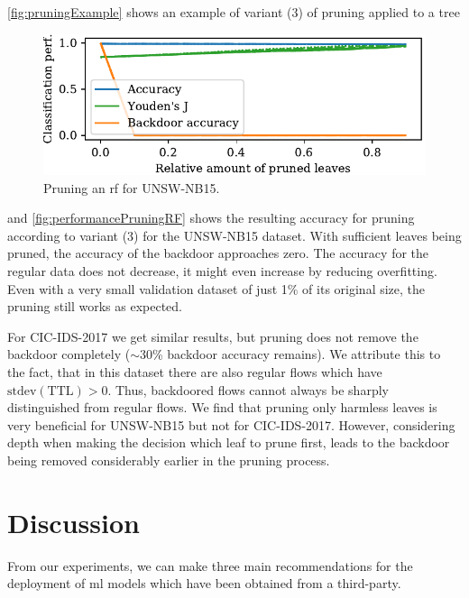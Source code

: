\documentclass[10pt,sigconf,letterpaper,dvipsnames]{acmart}
\newcommand\note[2]{{\color{#1}#2}}
\newcommand\todo[1]{{\note{red}{TODO: #1}}}
\newcommand{\unsw}{UNSW-NB15}
\newcommand{\cic}{CIC-IDS-2017}
\begin{document}
\autoref{fig:pruningExample} shows an example of variant (3) of pruning applied to a tree
\begin{figure}[h]
\includegraphics[width=\columnwidth]{../prune_CAIA_backdoor_15/prune_oh_d.pdf}
\caption{Pruning an \gls{rf} for \unsw{}.}
\label{fig:performancePruningRF}
\end{figure}
and \autoref{fig:performancePruningRF} shows the resulting accuracy for pruning according to variant (3) for the \unsw{} dataset. With sufficient leaves being pruned, the accuracy of the backdoor approaches zero. The accuracy for the regular data does not decrease, it might even increase by
reducing overfitting. %
Even with a very small validation dataset of just 1\% of its original size, the pruning still works as expected.

For \cic{} we get similar results, but pruning does not remove the backdoor completely ($\sim$30\% backdoor accuracy remains). We attribute this to the fact, that in this dataset there are also regular flows which have $\text{stdev}(\text{TTL}) > 0$. Thus, backdoored flows cannot always be sharply distinguished from regular flows. We find that pruning only harmless leaves is very beneficial for \unsw{} but not for \cic{}. However, considering depth when making the decision which leaf to prune first, leads to the backdoor being removed considerably earlier in the pruning process.


\section{Discussion}
From our experiments, we can make three main recommendations for the deployment of \gls{ml} models which have been obtained from a third-party.
\end{document}
